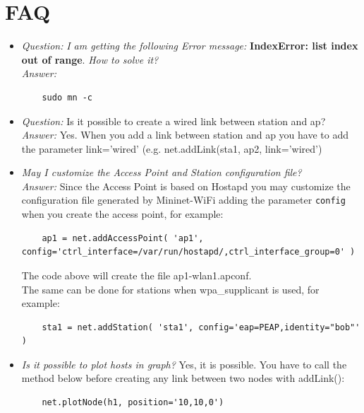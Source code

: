 \section{FAQ}

\begin{itemize}
\item \textit{Question:} \textit{I am getting the following Error message:} \textbf{IndexError: list index out of range}. \textit{How to solve it?}\\
\textit{Answer:}
\begin{verbatim}
    sudo mn -c
\end{verbatim}
\item \textit{Question:} Is it possible to create a wired link between station and ap?\\
\textit{Answer:} Yes. When you add a link between station and ap you have to add the parameter link='wired' (e.g. net.addLink(sta1, ap2, link='wired')\\

\item \textit{May I customize the Access Point and Station configuration file?}
\\
\textit{Answer:} Since the Access Point is based on Hostapd you may customize the configuration file generated by Mininet-WiFi adding the parameter \texttt{config} when you create the access point, for example:\\

\begin{verbatim}
    ap1 = net.addAccessPoint( 'ap1', config='ctrl_interface=/var/run/hostapd/,ctrl_interface_group=0' )
\end{verbatim}

The code above will create the file ap1-wlan1.apconf. \\

The same can be done for stations when wpa\_supplicant is used, for example:

\begin{verbatim}
    sta1 = net.addStation( 'sta1', config='eap=PEAP,identity="bob"' )
\end{verbatim}


\item \textit{Is it possible to plot hosts in graph?}
Yes, it is possible. You have to call the method below before creating any link between two nodes with addLink():

\begin{verbatim}
    net.plotNode(h1, position='10,10,0')
\end{verbatim}
\end{itemize}